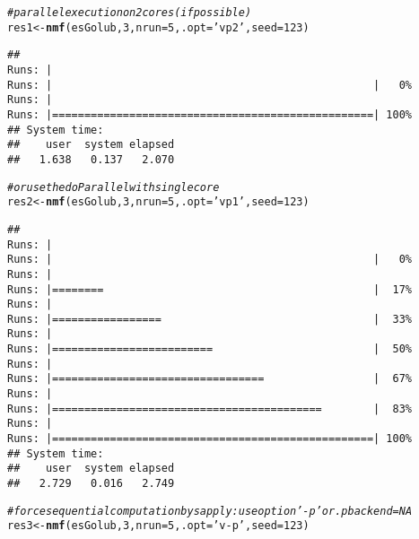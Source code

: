 \documentclass[a4paper]{article}\usepackage[]{graphicx}\usepackage[]{color}
\makeatletter
\newcommand{\hlnum}[1]{\textcolor[rgb]{0.686,0.059,0.569}{#1}}%
\newcommand{\hlstr}[1]{\textcolor[rgb]{0.192,0.494,0.8}{#1}}%
\newcommand{\hlcom}[1]{\textcolor[rgb]{0.678,0.584,0.686}{\textit{#1}}}%
\newcommand{\hlstd}[1]{\textcolor[rgb]{0.345,0.345,0.345}{#1}}%
\newcommand{\hlkwb}[1]{\textcolor[rgb]{0.69,0.353,0.396}{#1}}%
\newcommand{\hlkwc}[1]{\textcolor[rgb]{0.333,0.667,0.333}{#1}}%
\newcommand{\hlkwd}[1]{\textcolor[rgb]{0.737,0.353,0.396}{\textbf{#1}}}%
\newenvironment{kframe}{%
 \def\at@end@of@kframe{}%
 \ifinner\ifhmode%
  \def\at@end@of@kframe{\end{minipage}}%
  \begin{minipage}{\columnwidth}%
 \fi\fi%
 \def\FrameCommand##1{\hskip\@totalleftmargin \hskip-\fboxsep
 \colorbox{shadecolor}{##1}\hskip-\fboxsep
     \hskip-\linewidth \hskip-\@totalleftmargin \hskip\columnwidth}%
 \MakeFramed {\advance\hsize-\width
   \@totalleftmargin\z@ \linewidth\hsize
   \@setminipage}}%
 {\par\unskip\endMakeFramed%
 \at@end@of@kframe}
\newenvironment{knitrout}{}{} %
\makeatother
\begin{document}
\begin{knitrout}
\color{fgcolor}\begin{kframe}
\begin{alltt}
\hlcom{# parallel execution on 2 cores (if possible)}
\hlstd{res1} \hlkwb{<-} \hlkwd{nmf}\hlstd{(esGolub,} \hlnum{3}\hlstd{,} \hlkwc{nrun}\hlstd{=}\hlnum{5}\hlstd{,} \hlkwc{.opt}\hlstd{=}\hlstr{'vp2'}\hlstd{,} \hlkwc{seed}\hlstd{=}\hlnum{123}\hlstd{)}
\end{alltt}


{\ttfamily\noindent\itshape\color{messagecolor}{\#\# NMF algorithm: 'brunet'\\\#\# Multiple runs: 5\\\#\# Mode: parallel (2/4 core(s))}}\begin{verbatim}
## 
Runs: |                                                        
Runs: |                                                  |   0%
Runs: |                                                        
Runs: |==================================================| 100%
## System time:
##    user  system elapsed 
##   1.638   0.137   2.070
\end{verbatim}
\begin{alltt}
\hlcom{# or use the doParallel with single core}
\hlstd{res2} \hlkwb{<-} \hlkwd{nmf}\hlstd{(esGolub,} \hlnum{3}\hlstd{,} \hlkwc{nrun}\hlstd{=}\hlnum{5}\hlstd{,} \hlkwc{.opt}\hlstd{=}\hlstr{'vp1'}\hlstd{,} \hlkwc{seed}\hlstd{=}\hlnum{123}\hlstd{)}
\end{alltt}


{\ttfamily\noindent\itshape\color{messagecolor}{\#\# NMF algorithm: 'brunet'\\\#\# Multiple runs: 5\\\#\# Mode: sequential [foreach:doParallelMC]}}\begin{verbatim}
## 
Runs: |                                                        
Runs: |                                                  |   0%
Runs: |                                                        
Runs: |========                                          |  17%
Runs: |                                                        
Runs: |=================                                 |  33%
Runs: |                                                        
Runs: |=========================                         |  50%
Runs: |                                                        
Runs: |=================================                 |  67%
Runs: |                                                        
Runs: |==========================================        |  83%
Runs: |                                                        
Runs: |==================================================| 100%
## System time:
##    user  system elapsed 
##   2.729   0.016   2.749
\end{verbatim}
\begin{alltt}
\hlcom{# force sequential computation by sapply: use option '-p' or .pbackend=NA  }
\hlstd{res3} \hlkwb{<-} \hlkwd{nmf}\hlstd{(esGolub,} \hlnum{3}\hlstd{,} \hlkwc{nrun}\hlstd{=}\hlnum{5}\hlstd{,} \hlkwc{.opt}\hlstd{=}\hlstr{'v-p'}\hlstd{,} \hlkwc{seed}\hlstd{=}\hlnum{123}\hlstd{)}
\end{alltt}



\end{kframe}
\end{knitrout}
\end{document}
